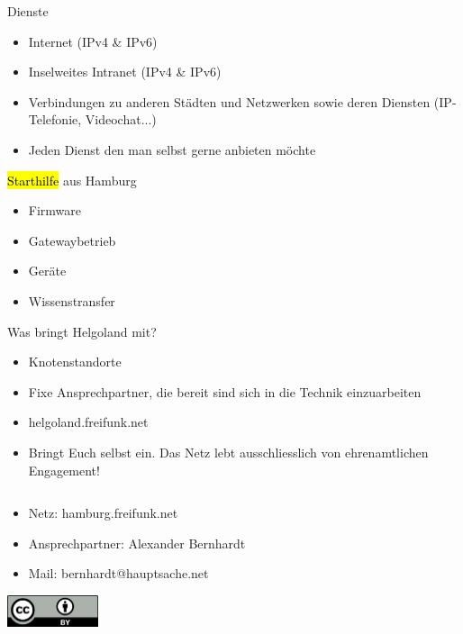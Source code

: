 \documentclass[t]{beamer}
\begin{document}
\begin{frame}{Dienste}
	\begin{itemize}
		\item Internet (IPv4 \& IPv6)
		\item Inselweites Intranet (IPv4 \& IPv6)
		\item Verbindungen zu anderen Städten und Netzwerken sowie deren Diensten (IP-Telefonie, Videochat...)
		\item Jeden Dienst den man selbst gerne anbieten möchte
	\end{itemize}
\end{frame}


%
\begin{frame}{\hl{Starthilfe} aus Hamburg}
	\begin{itemize}
		\item Firmware
		\item Gatewaybetrieb
		\item Geräte
		\item Wissenstransfer
	\end{itemize}
\end{frame}


%
\begin{frame}{Was bringt Helgoland mit?}
	\begin{itemize}
		\item Knotenstandorte
		\item Fixe Ansprechpartner, die bereit sind sich in die Technik einzuarbeiten
		\item helgoland.freifunk.net
		\item Bringt Euch selbst ein. Das Netz lebt ausschliesslich von ehrenamtlichen Engagement!
	\end{itemize}
\end{frame}


\begin{frame}{}
	\begin{columns}
		\begin{column}{1\textwidth}
			\begin{itemize}
				\item Netz: hamburg.freifunk.net
				\item Ansprechpartner: Alexander Bernhardt 
				\item Mail: bernhardt@hauptsache.net
		\end{itemize}
			\begin{center}
				\includegraphics[width=0.2\textwidth]{Bilder/cc-by}
			\end{center}
		\end{column}
	\end{columns}
\end{frame}
\end{document}
